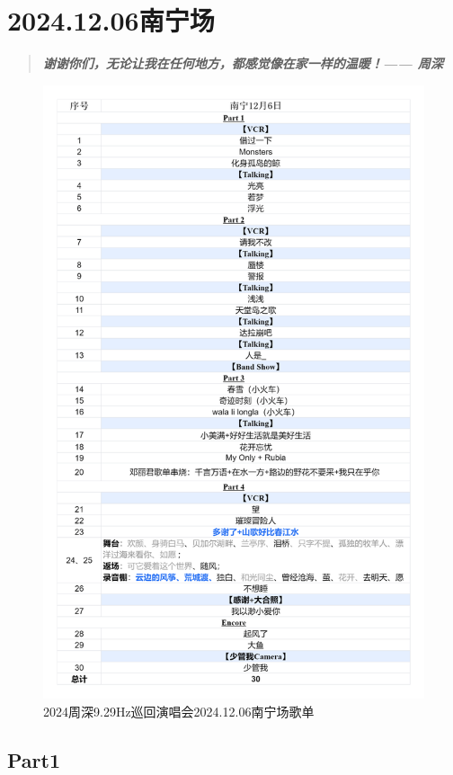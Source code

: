 \documentclass[]{ctexbook}
\begin{document}
\chapter{2024.12.06南宁场}\label{nanning-20241206}

\begin{quote}
\textbf{\emph{谢谢你们，无论让我在任何地方，都感觉像在家一样的温暖！------ 周深}}
\end{quote}

\begin{figure}

{\centering \includegraphics[width=320pt]{img/playlists/playlists-nanning-20241206} 

}

\caption{2024周深9.29Hz巡回演唱会2024.12.06南宁场歌单}\label{fig:unnamed-chunk-136}
\end{figure}

\newpage

\section{Part1}\label{nanning-20241206-part1}
\end{document}
